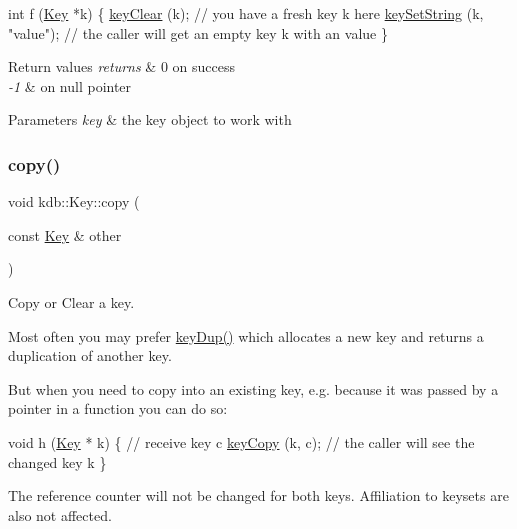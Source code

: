 \begin{DoxyCode}
\textcolor{keywordtype}{int} f (\hyperlink{classkdb_1_1Key_a5679f5cae63caddd64a60388b9cc77fa}{Key} *k)
\{
        \hyperlink{group__key_gab2242311a36bbc0520e0d36895107ec1}{keyClear} (k);
        \textcolor{comment}{// you have a fresh key k here}
        \hyperlink{group__keyvalue_ga622bde1eb0e0c4994728331326340ef2}{keySetString} (k, \textcolor{stringliteral}{"value"});
        \textcolor{comment}{// the caller will get an empty key k with an value}
\}
\end{DoxyCode}



\begin{DoxyRetVals}{Return values}
{\em returns} & 0 on success \\
\hline
{\em -\/1} & on null pointer\\
\hline
\end{DoxyRetVals}

\begin{DoxyParams}{Parameters}
{\em key} & the key object to work with \\
\hline
\end{DoxyParams}
\mbox{\label{classkdb_1_1Key_ab5bc93e22f4cf40b9d2b1fc32cc260be}} 
\subsubsection{\texorpdfstring{copy()}{copy()}}
{\footnotesize\ttfamily void kdb\+::\+Key\+::copy (\begin{DoxyParamCaption}\item[{const \hyperlink{classkdb_1_1Key}{Key} \&}]{other }\end{DoxyParamCaption})\hspace{0.3cm}{\ttfamily [inline]}}



Copy or Clear a key. 

Most often you may prefer \hyperlink{group__key_gae6ec6a60cc4b8c1463fa08623d056ce3}{key\+Dup()} which allocates a new key and returns a duplication of another key.

But when you need to copy into an existing key, e.\+g. because it was passed by a pointer in a function you can do so\+:


\begin{DoxyCodeInclude}
\textcolor{keywordtype}{void} h (\hyperlink{classkdb_1_1Key_a5679f5cae63caddd64a60388b9cc77fa}{Key} * k)
\{
        \textcolor{comment}{// receive key c}
        \hyperlink{group__key_ga6a12cbbe656a1ad9f41b8c681d7a2f92}{keyCopy} (k, c);
        \textcolor{comment}{// the caller will see the changed key k}
\}
\end{DoxyCodeInclude}
 The reference counter will not be changed for both keys. Affiliation to keysets are also not affected.

